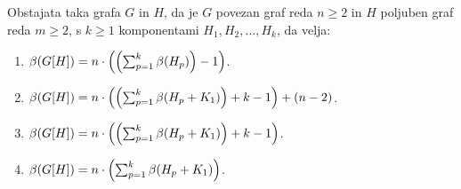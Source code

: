 \documentclass[mat1, tisk]{fmfdelo}
\newcommand{\1}{(1, 1, \ldots, 1)}
\newcommand{\2}{(2, 2, \ldots, 2)}
\begin{document}
    \begin{izrek} \label{izrek:primeri_mdim_komp}
    Obstajata taka grafa $G$ in $H$, da je $G$ povezan graf reda $n \geq 2$ in $H$ poljuben graf 
    reda $m \geq 2$, s $k \geq 1$ komponentami $H_1, H_2, \dots , H_k$, da velja:
    \begin{enumerate}
        \item $\beta(G[H]) = n \cdot \Bigl ( \Bigl ( \sum_{p=1}^{k} \beta(H_p) \Bigr )  - 1  \Bigr )$.
        \item $\beta(G[H]) = n \cdot \Bigl ( \Bigl ( \sum_{p=1}^{k} \beta(H_p + K_1) \Bigr ) + k - 1 
         \Bigr ) + (n-2)$.
        \item $\beta(G[H]) = n \cdot \Bigl ( \Bigl ( \sum_{p=1}^{k} \beta(H_p + K_1) \Bigr ) + k - 1  
        \Bigr )$.
        \item $\beta(G[H]) = n \cdot \Bigl ( \sum_{p=1}^{k} \beta(H_p + K_1) \Bigr ) $.
    \end{enumerate}
    \end{izrek}
    
\end{document}
